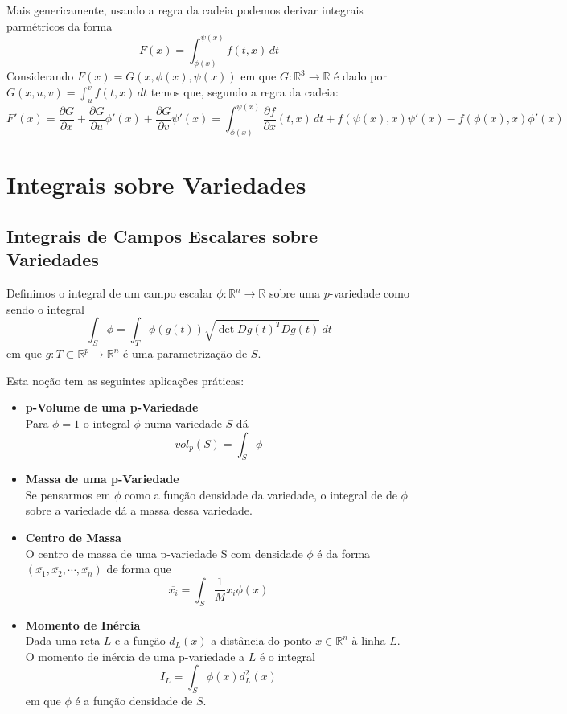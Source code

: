 \documentclass{article}
\newcommand{\R}{\mathbb{R}}
\begin{document}
Mais genericamente, usando a regra da cadeia podemos derivar integrais parmétricos da forma
$$
F(x) = \int_{\phi(x)}^{\psi(x)} f(t,x) \, dt
$$
Considerando $F(x) = G(x, \phi(x), \psi(x))$ em que $G: \R^3 \to \R$ é dado por $G(x,u,v) = \int_u^v f(t,x) \, dt$ temos que, segundo a regra da cadeia:
$$
F'(x) = \frac{\partial G}{\partial x} + \frac{\partial G}{\partial u}\phi '(x) + \frac{\partial G}{\partial v} \psi '(x) = \int_{\phi(x)}^{\psi(x)} \frac{\partial f}{\partial x}(t,x) \, dt + f(\psi(x), x)\psi'(x) - f(\phi(x),x)\phi'(x)  
$$

\section{Integrais sobre Variedades}

\subsection{Integrais de Campos Escalares sobre Variedades}
Definimos o integral de um campo escalar $\phi: \R^n \to \R$ sobre uma $p$-variedade como sendo o integral
$$ \int_S \phi = \int_T \phi(g(t)) \sqrt{\det Dg(t)^T Dg(t)} \, dt $$
em que $g: T \subset \R^p \to \R^n$ é uma parametrização de $S$.

Esta noção tem as seguintes aplicações práticas:
\begin{itemize}
	\item \textbf{p-Volume de uma p-Variedade}\\
	Para $\phi = 1$ o integral $\phi$ numa variedade $S$ dá
	$$ vol_p(S) = \int_S \phi $$ 
	\item \textbf{Massa de uma p-Variedade}\\
	Se pensarmos em $\phi$ como a função densidade da variedade, o integral de de $\phi$ sobre a variedade dá a massa dessa variedade.
	\item \textbf{Centro de Massa}\\
	O centro de massa de uma p-variedade S com densidade $\phi$ é da forma $(\overline{x_1}, \overline{x_2}, \cdots, \overline{x_n})$ de forma que
	$$ \overline{x_i} = \int_S \frac{1}{M}x_i \phi(x) $$
	\item \textbf{Momento de Inércia}\\
	Dada uma reta $L$ e a função $d_L(x)$ a distância do ponto $x \in \R^n$ à linha $L$. O momento de inércia de uma p-variedade a $L$ é o integral
	$$ I_L = \int_S \phi(x)d_L^2(x) $$
	em que $\phi$ é a função densidade de $S$.
\end{itemize}
\end{document}
